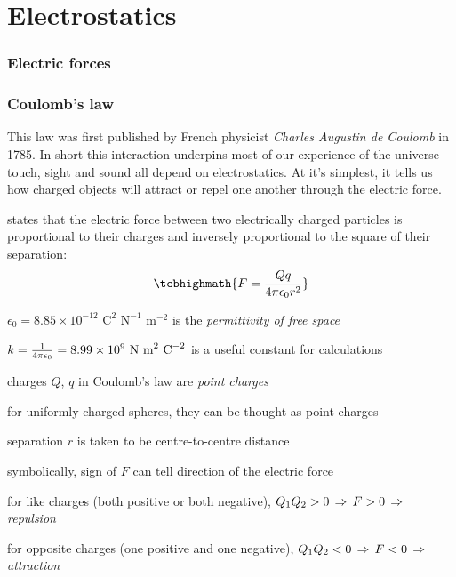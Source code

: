 \chapter{Electrostatics}

\subsection{Electric forces}

\subsection{Coulomb's law}
This law was first published by French physicist \emph{Charles Augustin de Coulomb} in 1785. In short this interaction underpins most of our experience of the universe - touch, sight and sound all depend on electrostatics. At it's simplest, it tells us how charged objects will attract or repel one another through the electric force.

\begin{ilight}
	 states that the electric force between two electrically charged particles is proportional to their charges and inversely proportional to the square of their separation: $$\tcbhighmath{F = \frac{Qq}{4\pi\epsilon_0 r^2}}$$
\end{ilight}

$\epsilon_0 = 8.85 \times 10^{-12} \text{ C}^2 \text{ N}^{-1} \text{ m}^{-2}$ is the \emph{permittivity of free space}

$k = \frac{1}{4\pi\epsilon_0} = 8.99 \times 10^9 \text{ N m}^2 \text{ C}^{-2}$ is a useful constant for calculations


\cmt charges $Q$, $q$ in Coulomb's law are \emph{point charges}

\cmt for uniformly charged spheres, they can be thought as point charges

separation $r$ is taken to be centre-to-centre distance

\cmt symbolically, sign of $F$ can tell direction of the electric force

for like charges (both positive or both negative), $Q_1Q_2>0 \, \Rightarrow \, F>0 \, \Rightarrow \,$  \emph{repulsion}

for opposite charges (one positive and one negative), $Q_1Q_2<0 \, \Rightarrow \, F<0 \, \Rightarrow \,$  \emph{attraction}


